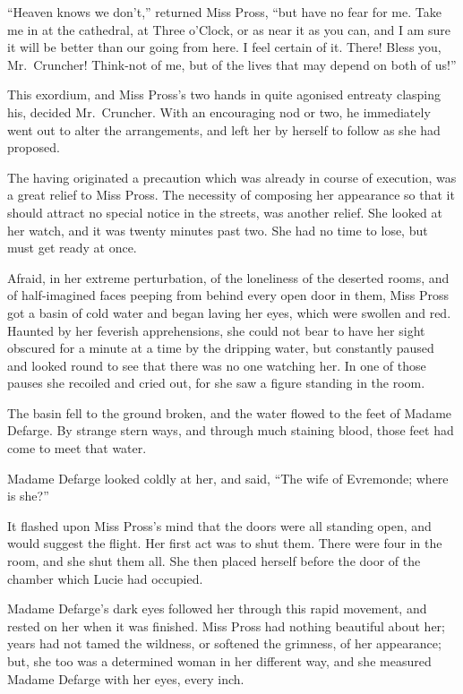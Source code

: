 ``Heaven knows we don't,'' returned Miss Pross, ``but have no fear for
me. Take me in at the cathedral, at Three o'Clock, or as near it as
you can, and I am sure it will be better than our going from here.
I feel certain of it.  There!  Bless you, Mr.\ Cruncher!  Think-not of
me, but of the lives that may depend on both of us!''

This exordium, and Miss Pross's two hands in quite agonised entreaty
clasping his, decided Mr.\ Cruncher.  With an encouraging nod or two,
he immediately went out to alter the arrangements, and left her by
herself to follow as she had proposed.

The having originated a precaution which was already in course of
execution, was a great relief to Miss Pross.  The necessity of
composing her appearance so that it should attract no special notice
in the streets, was another relief.  She looked at her watch, and it
was twenty minutes past two.  She had no time to lose, but must get
ready at once.

Afraid, in her extreme perturbation, of the loneliness of the
deserted rooms, and of half-imagined faces peeping from behind every
open door in them, Miss Pross got a basin of cold water and began
laving her eyes, which were swollen and red.  Haunted by her feverish
apprehensions, she could not bear to have her sight obscured for a
minute at a time by the dripping water, but constantly paused and
looked round to see that there was no one watching her.  In one of
those pauses she recoiled and cried out, for she saw a figure
standing in the room.

The basin fell to the ground broken, and the water flowed to the feet
of Madame Defarge.  By strange stern ways, and through much staining
blood, those feet had come to meet that water.

Madame Defarge looked coldly at her, and said, ``The wife of Evremonde;
where is she?''

It flashed upon Miss Pross's mind that the doors were all standing
open, and would suggest the flight.  Her first act was to shut them.
There were four in the room, and she shut them all.  She then placed
herself before the door of the chamber which Lucie had occupied.

Madame Defarge's dark eyes followed her through this rapid movement,
and rested on her when it was finished.  Miss Pross had nothing
beautiful about her; years had not tamed the wildness, or softened
the grimness, of her appearance; but, she too was a determined woman
in her different way, and she measured Madame Defarge with her eyes,
every inch.

